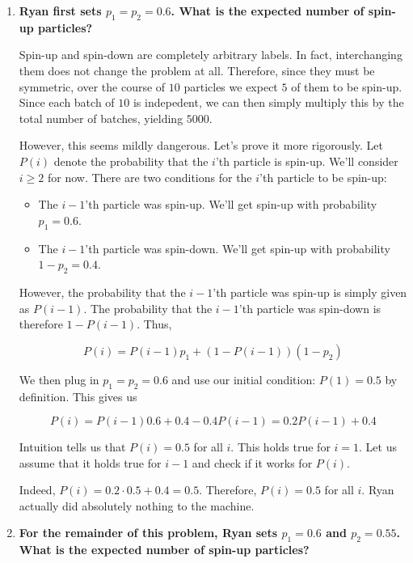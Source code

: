 \documentclass{article}
\begin{document}
\begin{enumerate}[label=(\alph*)]
    \item \textbf{Ryan first sets $p_1 = p_2 = 0.6$. What is the expected number of spin-up particles?}
    
    Spin-up and spin-down are completely arbitrary labels. In fact, interchanging them does not change the problem at all. Therefore, since they must be symmetric, over the course of $10$ particles we expect $5$ of them to be spin-up. Since each batch of $10$ is indepedent, we can then simply multiply this by the total number of batches, yielding $\boxed{5000}$.
    
    However, this seems mildly dangerous. Let's prove it more rigorously. Let $P(i)$ denote the probability that the $i$'th particle is spin-up. We'll consider $i \geq 2$ for now. There are two conditions for the $i$'th particle to be spin-up:
    
    \begin{itemize}
        \item The $i - 1$'th particle was spin-up. We'll get spin-up with probability $p_1 = 0.6$.
        \item The $i - 1$'th particle was spin-down. We'll get spin-up with probability $1 - p_2 = 0.4$.
    \end{itemize}
    
    However, the probability that the $i - 1$'th particle was spin-up is simply given as $P(i - 1)$. The probability that the $i - 1$'th particle was spin-down is therefore $1 - P(i - 1)$. Thus,
    
    $$P(i) = P(i - 1)p_1 + (1 - P(i - 1))(1 - p_2)$$
    
    We then plug in $p_1 = p_2 = 0.6$ and use our initial condition: $P(1) = 0.5$ by definition. This gives us
    
    $$P(i) = P(i - 1)0.6 + 0.4 - 0.4P(i - 1) = 0.2P(i - 1) + 0.4$$
    
    Intuition tells us that $P(i) = 0.5$ for all $i$. This holds true for $i = 1$. Let us assume that it holds true for $i - 1$ and check if it works for $P(i)$.
    
    Indeed, $P(i) = 0.2 \cdot 0.5 + 0.4 = 0.5$. Therefore, $P(i) = 0.5$ for all $i$. Ryan actually did absolutely nothing to the machine.

    \vspace{2cm}
    
    \item \textbf{For the remainder of this problem, Ryan sets $p_1 = 0.6$ and $p_2 = 0.55$. What is the expected number of spin-up particles?}
    

\end{enumerate}
\end{document}
